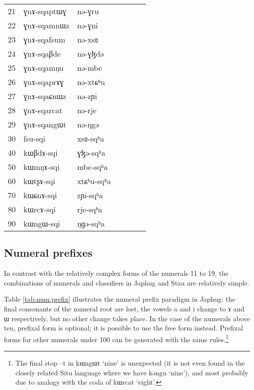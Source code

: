 \documentclass[oldfontcommands,oneside,a4paper,12pt]{article}
\newcommand{\ipa}[1]{{\phon#1}}
\begin{document}
\begin{table}[H]
\begin{tabular}{lllllll}
21	&	\ipa{ɣnɤ-sqaptɯɣ}  &	\ipa{nə-ɣru}  &	\\	
22	&	\ipa{ɣnɤ-sqamnɯz}  &	\ipa{nə-ɣni}  &	\\	
23	&	\ipa{ɣnɤ-sqafsum}  &	\ipa{nə-xsʚ}  &	\\	
24	&	\ipa{ɣnɤ-sqaβde}  &	\ipa{nə-ɣɮdə}  &	\\	
25	&	\ipa{ɣnɤ-sqamŋu}  &	\ipa{nə-mbe}  &	\\	
26	&	\ipa{ɣnɤ-sqaprɤɣ}  &	\ipa{nə-xtɕʰu}  &	\\	
27	&	\ipa{ɣnɤ-sqaɕnɯz}  &	\ipa{nə-zɲi}  &	\\	
28	&	\ipa{ɣnɤ-sqarcat}  &	\ipa{nə-rje}  &	\\	
29	&	\ipa{ɣnɤ-sqangɯt}  &	\ipa{nə-ŋgə}  &	\\	
\midrule					
30	&	\ipa{fsu-sqi}  &	\ipa{xsʚ-sqʰa}  &	\\	
40	&	\ipa{kɯβdɤ-sqi}  &	\ipa{ɣɮə-sqʰa}  &	\\	
50	&	\ipa{kɯmŋɤ-sqi}  &	\ipa{mbe-sqʰa}  &	\\	
60	&	\ipa{kɯtʂɤ-sqi}  &	\ipa{xtɕʰu-sqʰa}  &	\\	
70	&	\ipa{kɯɕnɤ-sqi}  &	\ipa{zɲi-sqʰa}  &	\\	
80	&	\ipa{kɯrcɤ-sqi}  &	\ipa{rje-sqʰa}  &	\\	
90	&	\ipa{kɯngɯ-sqi}  &	\ipa{ŋɡə-sqʰa}  &	\\	
\bottomrule
\end{tabular}
\end{table}
		


 \subsection{Numeral prefixes} \label{sec:prefixes.japhug}
 
 In contrast with the relatively complex forms of the numerals 11 to 19, the combinations of numerals and classifiers in Japhug and Stau are relatively simple. 
 
Table \ref{tab:num.prefix} illustrates the numeral prefix paradigm in Japhug: the final consonants of the numeral root are lost, the vowels \ipa{a} and \ipa{i} change to \ipa{ɤ} and \ipa{ɯ} respectively, but no other change takes place. In the case of the numerals above ten, prefixal form is optional; it is possible to use the free form instead. Prefixal forms for other numerals under 100 can be generated with the same rules.\footnote{The final stop \ipa{--t} in \ipa{kɯngɯt} `nine' is unexpected (it is not even found in the closely related Situ language where we have \ipa{kəngu} `nine'), and most probably due to analogy with the coda of \ipa{kɯrcat}  `eight'. }
 
\end{document}
